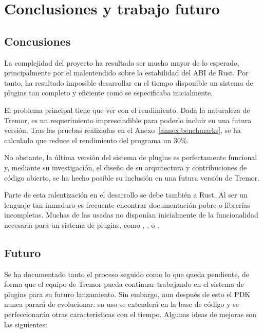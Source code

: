 
\chapter{Conclusiones y trabajo futuro}

\section{Concusiones}

La complejidad del proyecto ha resultado ser mucho mayor de lo esperado,
principalmente por el malentendido sobre la estabilidad del ABI de Rust. Por
tanto, ha resultado imposible desarrollar en el tiempo disponible un sistema de
plugins tan completo y eficiente como se especificaba inicialmente.

El problema principal tiene que ver con el rendimiento. Dada la naturaleza de
Tremor, es un requerimiento imprescindible para poderlo incluir en una futura
versión. Tras las pruebas realizadas en el Anexo~\ref{annex:benchmarks}, se ha
calculado que reduce el rendimiento del programa un 30\%.

No obstante, la última versión del sistema de plugins es perfectamente funcional
y, mediante su investigación, el diseño de su arquitectura y contribuciones de
código abierto, se ha hecho posible su inclusión en una futura versión de
Tremor.

Parte de esta ralentización en el desarrollo se debe también a Rust. Al ser un
lenguaje tan inmaduro es frecuente encontrar documentación pobre o librerías
incompletas. Muchas de las \crates usadas no disponían inicialmente de la
funcionalidad necesaria para un sistema de plugins, como ,
,  o .

\section{Futuro}

Se ha documentado tanto el proceso seguido como lo que queda pendiente, de forma
que el equipo de Tremor pueda continuar trabajando en el sistema de plugins para
su futuro lanzamiento. Sin embargo, aun después de esto el PDK nunca parará de
evolucionar: su uso se extenderá en la base de código y se perfeccionarán otras
características con el tiempo. Algunas ideas de mejoras son las siguientes:

